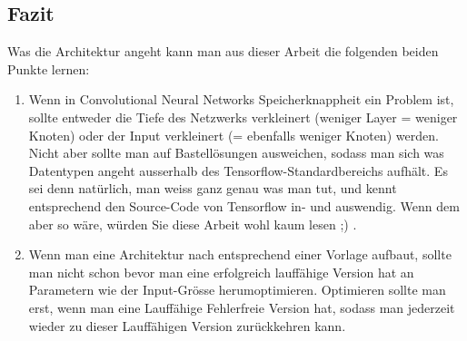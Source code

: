 \subsection{Fazit}
Was die Architektur angeht kann man aus dieser Arbeit die folgenden beiden Punkte lernen:
\begin{enumerate}
\item Wenn in Convolutional Neural Networks Speicherknappheit ein Problem ist, sollte entweder die Tiefe des Netzwerks verkleinert (weniger Layer = weniger Knoten) oder der Input verkleinert (= ebenfalls weniger Knoten) werden. Nicht aber sollte man auf Bastellösungen ausweichen, sodass man sich was Datentypen angeht ausserhalb des Tensorflow-Standardbereichs aufhält. Es sei denn natürlich, man weiss ganz genau was man tut, und kennt entsprechend den Source-Code von Tensorflow in- und auswendig. Wenn dem aber so wäre, würden Sie diese Arbeit wohl kaum lesen ;) .
\item Wenn man eine Architektur nach entsprechend einer Vorlage aufbaut, sollte man nicht schon bevor man eine erfolgreich lauffähige Version hat an Parametern wie der Input-Grösse herumoptimieren. Optimieren sollte man erst, wenn man eine Lauffähige Fehlerfreie Version hat, sodass man jederzeit wieder zu dieser Lauffähigen Version zurückkehren kann. 
\end{enumerate}




